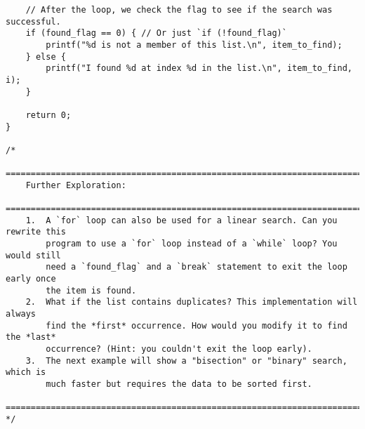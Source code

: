 \documentclass[11pt]{book}
\begin{document}
\begin{verbatim}
    // After the loop, we check the flag to see if the search was successful.
    if (found_flag == 0) { // Or just `if (!found_flag)`
        printf("%d is not a member of this list.\n", item_to_find);
    } else {
        printf("I found %d at index %d in the list.\n", item_to_find, i);
    }

    return 0;
}

/*
    ================================================================================
    Further Exploration:
    ================================================================================
    1.  A `for` loop can also be used for a linear search. Can you rewrite this
        program to use a `for` loop instead of a `while` loop? You would still
        need a `found_flag` and a `break` statement to exit the loop early once
        the item is found.
    2.  What if the list contains duplicates? This implementation will always
        find the *first* occurrence. How would you modify it to find the *last*
        occurrence? (Hint: you couldn't exit the loop early).
    3.  The next example will show a "bisection" or "binary" search, which is
        much faster but requires the data to be sorted first.
    ================================================================================
*/

\end{verbatim}
\clearpage
\end{document}
